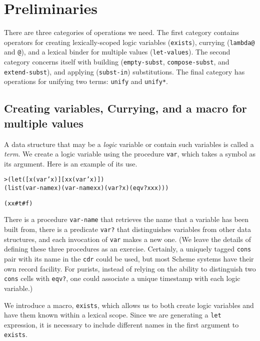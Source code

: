 \section{Preliminaries}

There are three categories of operations we need.  The first category
contains operators for creating lexically-scoped logic variables
(\texttt{exists}), currying (\texttt{lambda@} and \texttt{@}), and a
lexical binder for multiple values (\texttt{let-values}).  The second
category concerns itself with building (\texttt{empty-subst},
\texttt{compose-subst}, and \texttt{extend-subst}), and applying
(\texttt{subst-in}) substitutions.  The final category has 
operations for unifying two terms: \texttt{unify} and \texttt{unify*}.

\subsection{Creating variables, Currying, and a macro for multiple values}

A data structure that may be a \emph{logic} variable or contain such
variables is called a \emph{term}.  We create a logic variable using
the procedure \texttt{var}, which takes a symbol as its argument. Here
is an example of its use.

\begin{alltt}
> (let ([x (var 'x)] [xx (var 'x)])
    (list (var-name x) (var-name xx) (var? x) (eqv? x xx)))

(x x #t #f)
\end{alltt}

\noindent
There is a procedure \texttt{var-name} that retrieves the name that a
variable has been built from, there is a predicate \texttt{var?} that
distinguishes variables from other data structures, and each
invocation of \texttt{var} makes a new one.  (We leave the details of
defining these three procedures as an exercise.  Certainly, a uniquely
tagged \texttt{cons} pair with its name in the \texttt{cdr} could be
used, but most Scheme systems have their own record facility.  For
purists, instead of relying on the ability to distinguish two
\texttt{cons} cells with \texttt{eqv?}, one could associate a unique
timestamp with each logic variable.)

We introduce a macro, \texttt{exists}, which allows us to both create
logic variables and have them known within a lexical scope.  Since
we are generating a \texttt{let} expression, it is necessary to
include different names in the first argument to \texttt{exists}.

